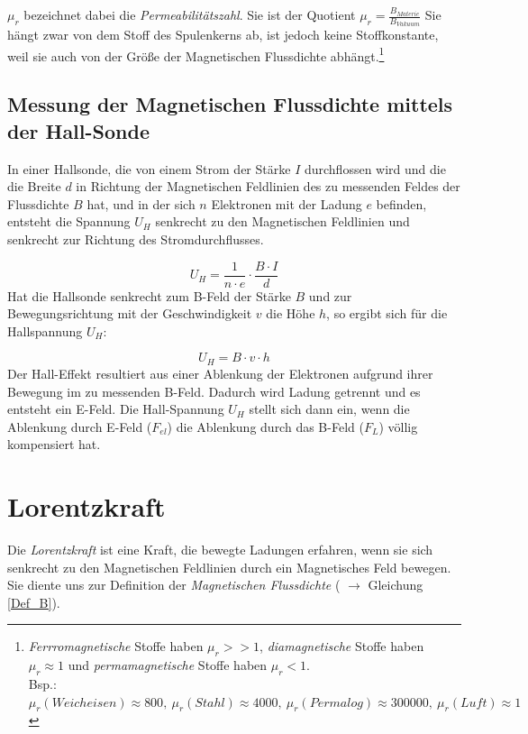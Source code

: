 \(\mu_r\) bezeichnet dabei die \textit{Permeabilitätszahl}. Sie ist der Quotient \(\mu_r = \frac{B_{Materie}}{B_{Vakuum}}\)  Sie hängt zwar von dem Stoff des Spulenkerns ab, ist jedoch keine Stoffkonstante, weil sie auch von der Größe der Magnetischen Flussdichte abhängt.\footnote{\textit{Ferrromagnetische} Stoffe haben \(\mu_r >> 1\), \textit{diamagnetische} Stoffe haben \(\mu_r \approx 1\) und \textit{permamagnetische} Stoffe haben \(\mu_r < 1\). \\ Bsp.: \(\mu_r(Weicheisen) \approx 800, \: \mu_r(Stahl) \approx 4000, \: \mu_r(Permalog) \approx 300000, \: \mu_r(Luft) \approx 1\)}

		\section{Messung der Magnetischen Flussdichte mittels der Hall-Sonde}

In einer Hallsonde, die von einem Strom der Stärke \(I\) durchflossen wird und die die Breite \(d\) in Richtung der Magnetischen Feldlinien des zu messenden Feldes der Flussdichte \(B\) hat, und in der sich \(n\) Elektronen mit der Ladung \(e\) befinden, entsteht die Spannung \(U_H\) senkrecht zu den Magnetischen Feldlinien und senkrecht zur Richtung des Stromdurchflusses.

\begin{equation}
U_H = \frac{1}{n \cdot e} \cdot \frac{B \cdot I}{d}
\end{equation}
Hat die Hallsonde senkrecht zum B-Feld der Stärke \(B\) und zur Bewegungsrichtung mit der Geschwindigkeit \(v\) die Höhe \(h\), so ergibt sich für die Hallspannung \(U_H\):

\begin{equation}
U_H = B \cdot v \cdot h
\end{equation}
Der Hall-Effekt resultiert aus einer Ablenkung der Elektronen aufgrund ihrer Bewegung im zu messenden B-Feld. Dadurch wird Ladung getrennt und es entsteht ein E-Feld. Die Hall-Spannung \(U_H\) stellt sich dann ein, wenn die Ablenkung durch E-Feld (\(F_{el}\)) die Ablenkung durch das B-Feld (\(F_L\)) völlig kompensiert hat.

		\chapter{Lorentzkraft}
		\label{Lor}

Die \textit{Lorentzkraft} ist eine Kraft, die bewegte Ladungen erfahren, wenn sie sich senkrecht zu den Magnetischen Feldlinien durch ein Magnetisches Feld bewegen. Sie diente uns zur Definition der \textit{Magnetischen Flussdichte} ( \(\rightarrow\) Gleichung \ref{Def_B}).

